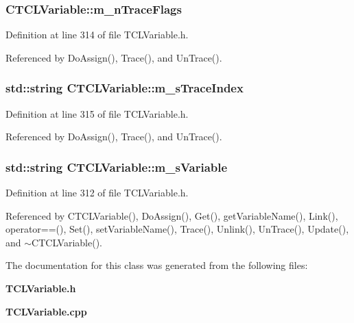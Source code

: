 \subsubsection{ CTCLVariable::m\_\-n\-Trace\-Flags\hspace{0.3cm}{\tt  [private]}}\label{classCTCLVariable_o2}




Definition at line 314 of file TCLVariable.h.

Referenced by Do\-Assign(), Trace(), and Un\-Trace().
\subsubsection{\setlength{\rightskip}{0pt plus 5cm}std::string CTCLVariable::m\_\-s\-Trace\-Index\hspace{0.3cm}{\tt  [private]}}\label{classCTCLVariable_o3}




Definition at line 315 of file TCLVariable.h.

Referenced by Do\-Assign(), Trace(), and Un\-Trace().
\subsubsection{\setlength{\rightskip}{0pt plus 5cm}std::string CTCLVariable::m\_\-s\-Variable\hspace{0.3cm}{\tt  [private]}}\label{classCTCLVariable_o0}




Definition at line 312 of file TCLVariable.h.

Referenced by CTCLVariable(), Do\-Assign(), Get(), get\-Variable\-Name(), Link(), operator==(), Set(), set\-Variable\-Name(), Trace(), Unlink(), Un\-Trace(), Update(), and $\sim$CTCLVariable().

The documentation for this class was generated from the following files:\begin{CompactItemize}
\item 
{\bf TCLVariable.h}\item 
{\bf TCLVariable.cpp}\end{CompactItemize}
